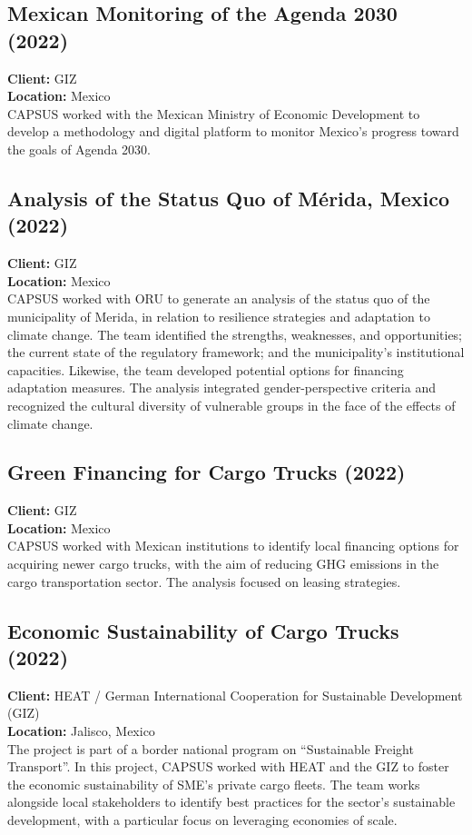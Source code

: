 \documentclass[
	a4paper,
	12pt,
	unnumberedsections,
]{CSSullivanBusinessReport}
\begin{document}
\subsection{Mexican Monitoring of the Agenda 2030 (2022)}
\textbf{Client:}  GIZ \\
\textbf{Location:}  Mexico \\[0.5em]
 CAPSUS worked with the Mexican Ministry of Economic Development to develop a methodology and digital platform to monitor Mexico's progress toward the goals of Agenda 2030.

\subsection{Analysis of the Status Quo of Mérida, Mexico (2022)}
\textbf{Client:}  GIZ \\
\textbf{Location:}  Mexico \\[0.5em]
 CAPSUS worked with ORU to generate an analysis of the status quo of the municipality of Merida, in relation to resilience strategies and adaptation to climate change. The team identified the strengths, weaknesses, and opportunities; the current state of the regulatory framework; and the municipality's institutional capacities. Likewise, the team developed potential options for financing adaptation measures. The analysis integrated gender-perspective criteria and recognized the cultural diversity of vulnerable groups in the face of the effects of climate change.

\subsection{Green Financing for Cargo Trucks (2022)}
\textbf{Client:}  GIZ \\
\textbf{Location:}  Mexico \\[0.5em]
 CAPSUS worked with Mexican institutions to identify local financing options for acquiring newer cargo trucks, with the aim of reducing GHG emissions in the cargo transportation sector. The analysis focused on leasing strategies.

\subsection{Economic Sustainability of Cargo Trucks (2022)}
\textbf{Client:}  HEAT / German International Cooperation for Sustainable Development (GIZ) \\
\textbf{Location:}  Jalisco, Mexico \\[0.5em]
 The project is part of a border national program on “Sustainable Freight Transport”. In this project, CAPSUS worked with HEAT and the GIZ to foster the economic sustainability of SME's private cargo fleets. The team works alongside local stakeholders to identify best practices for the sector's sustainable development, with a particular focus on leveraging economies of scale.
\end{document}
